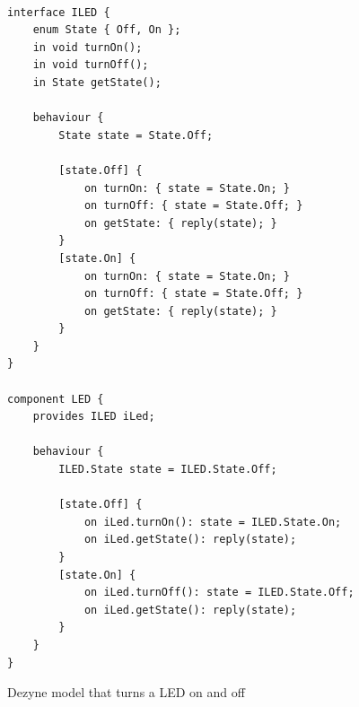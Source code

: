 \documentclass[12pt]{scrreprt}
\begin{document}
\begin{listing}[!ht]
\begin{verbatim}
               
interface ILED {
    enum State { Off, On };
    in void turnOn();
    in void turnOff();
    in State getState();

    behaviour {
        State state = State.Off;

        [state.Off] {
            on turnOn: { state = State.On; }
            on turnOff: { state = State.Off; }
            on getState: { reply(state); }
        }
        [state.On] {
            on turnOn: { state = State.On; }
            on turnOff: { state = State.Off; }
            on getState: { reply(state); }
        }
    }
}

component LED {
    provides ILED iLed;

    behaviour {
        ILED.State state = ILED.State.Off;

        [state.Off] {
            on iLed.turnOn(): state = ILED.State.On;
            on iLed.getState(): reply(state);
        }
        [state.On] {
            on iLed.turnOff(): state = ILED.State.Off;
            on iLed.getState(): reply(state);
        }
    }
}

\end{verbatim}
\caption{Dezyne model that turns a LED on and off}
\label{fig:theoretical_background_dezyne_model}
\end{listing}

\end{document}
